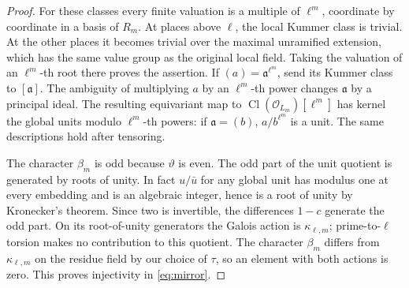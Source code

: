 \documentclass[a4paper,11pt]{article}
\theoremstyle{definition}
\theoremstyle{remark}
\numberwithin{equation}{section}
\newcommand{\Cl}{\operatorname{Cl}}
\newcommand{\OO}{\mathcal O}
\begin{document}
\begin{proof}
For these classes every finite valuation is a multiple of \(\ell^m\), coordinate by coordinate in a basis of \(R_m\). At places above \(\ell\), the local Kummer class is trivial. At the other places it becomes trivial over the maximal unramified extension, which has the same value group as the original local field. Taking the valuation of an \(\ell^m\)-th root there proves the assertion. If \((a)=\mathfrak a^{\ell^m}\), send its Kummer class to \([\mathfrak a]\). The ambiguity of multiplying \(a\) by an \(\ell^m\)-th power changes \(\mathfrak a\) by a principal ideal. The resulting equivariant map to \(\Cl(\OO_{L_m})[\ell^m]\) has kernel the global units modulo \(\ell^m\)-th powers: if \(\mathfrak a=(b)\), \(a/b^{\ell^m}\) is a unit. The same descriptions hold after tensoring.

The character \(\beta_m\) is odd because \(\vartheta\) is even. The odd part of the unit quotient is generated by roots of unity. In fact \(u/\bar u\) for any global unit has modulus one at every embedding and is an algebraic integer, hence is a root of unity by Kronecker's theorem. Since two is invertible, the differences \(1-c\) generate the odd part. On its root-of-unity generators the Galois action is \(\kappa_{\ell,m}\); prime-to-\(\ell\) torsion makes no contribution to this quotient. The character \(\beta_m\) differs from \(\kappa_{\ell,m}\) on the residue field by our choice of \(\tau\), so an element with both actions is zero. This proves injectivity in \eqref{eq:mirror}.
\end{proof}
\end{document}
